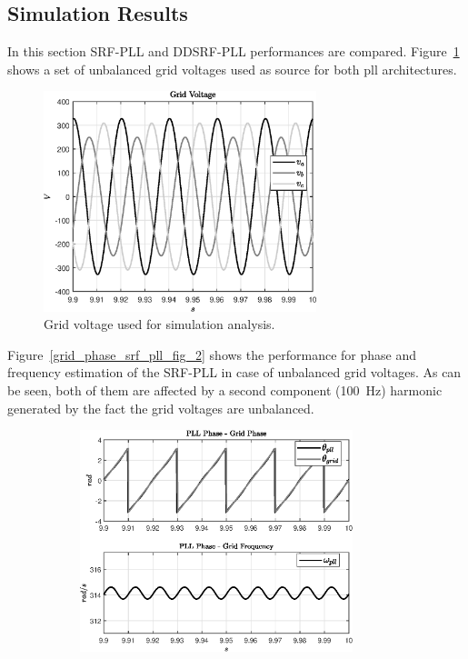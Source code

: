 \documentclass[11pt,a4paper,oneside]{book}
\numberwithin{equation}{section}
\theoremstyle{it}
\theoremstyle{definition}
\begin{document}
\begin{onehalfspace}
\section{Simulation Results}
In this section SRF-PLL and DDSRF-PLL performances are compared. Figure~\ref{grid_voltage_srf_pll_fig_1} shows a set of unbalanced grid voltages used as source for both pll architectures.  
\begin{figure}[H]
	\centering
	\includegraphics[width = 225pt, angle = 0, 
	keepaspectratio]{figures/pll/grid_voltage_srf_pll_fig_1.eps}
	\captionsetup{width=0.5\textwidth, font=small}	
	\caption{Grid voltage used for simulation analysis.}
	\label{grid_voltage_srf_pll_fig_1}
\end{figure}
Figure~\ref{grid_phase_srf_pll_fig_2} shows the performance for phase and frequency estimation of the SRF-PLL in case of unbalanced grid voltages. As can be seen, both of them are affected by a second component (\SI{100}{\hertz}) harmonic generated by the fact the grid voltages are unbalanced.
\begin{figure}[H]
	\centering
	\begin{subfigure}{0.5\textwidth}
		\centering
		\includegraphics[width = 225pt, angle = 0, 
		keepaspectratio]{figures/pll/grid_phase_srf_pll_fig_2.eps}
		\captionsetup{width=0.65\textwidth, font=footnotesize}	

\end{subfigure}
\end{figure}
\end{onehalfspace}
\end{document}
